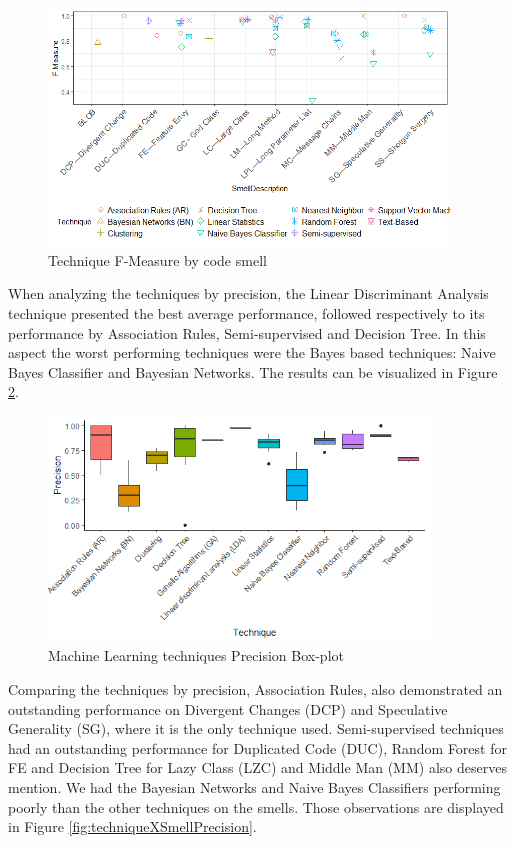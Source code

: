 \begin{figure}[!ht] 
    \centering
	\caption{Technique F-Measure by code smell}
	\label{fig:techniqueXSmellFMeasure}
	\includegraphics[width=0.95\textwidth]{imagens/TechniqueXSmellFMeasure.png}
\end{figure}

When analyzing the techniques by precision, the Linear Discriminant Analysis technique presented the best average performance, followed respectively to its performance by Association Rules, Semi-supervised and Decision Tree. In this aspect the worst performing techniques were the Bayes based techniques: Naive Bayes Classifier and Bayesian Networks. The results can be visualized in Figure \ref{fig:precisionByTechniques}.

\begin{figure}[!ht] 
    \centering
	\caption{Machine Learning techniques Precision Box-plot}
	\label{fig:precisionByTechniques}
	\includegraphics[width=0.9\textwidth]{imagens/precisionByTechniques.png}
\end{figure}

Comparing the techniques by precision, Association Rules, also demonstrated an outstanding performance on Divergent Changes (DCP) and Speculative Generality (SG), where it is the only technique used. Semi-supervised techniques had an outstanding performance for Duplicated Code (DUC), Random Forest for FE and Decision Tree for Lazy Class (LZC) and Middle Man (MM) also deserves mention. We had the Bayesian Networks and Naive Bayes Classifiers performing poorly than the other techniques on the smells. Those observations are displayed in Figure \ref{fig:techniqueXSmellPrecision}.

